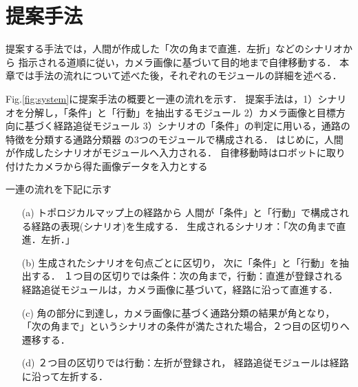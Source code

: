 \documentclass{sice-si}
\begin{document}
\section{提案手法}
提案する手法では，人間が作成した「次の角まで直進．左折」などのシナリオから
指示される道順に従い，カメラ画像に基づいて目的地まで自律移動する．
本章では手法の流れについて述べた後，それぞれのモジュールの詳細を述べる．
\par
Fig.\ref{fig:system}に提案手法の概要と一連の流れを示す．
提案手法は，1）シナリオを分解し，「条件」と「行動」を抽出するモジュール
2）カメラ画像と目標方向に基づく経路追従モジュール
3）シナリオの「条件」の判定に用いる，通路の特徴を分類する通路分類器
の3つのモジュールで構成される．
はじめに，人間が作成したシナリオがモジュールへ入力される．
自律移動時はロボットに取り付けたカメラから得た画像データを入力とする


一連の流れを下記に示す
\begin{enumerate}
    \item [(a)] トポロジカルマップ上の経路から
    人間が「条件」と「行動」で構成される経路の表現(シナリオ)を生成する．
    生成されるシナリオ：「次の角まで直進．左折．」
    \item [(b)] 生成されたシナリオを句点ごとに区切り，
    次に「条件」と「行動」を抽出する．
    １つ目の区切りでは条件：次の角まで，行動：直進が登録される
    経路追従モジュールは，カメラ画像に基づいて，経路に沿って直進する．
    \item [(c)] 角の部分に到達し，カメラ画像に基づく通路分類の結果が角となり，
    「次の角まで」というシナリオの条件が満たされた場合，２つ目の区切りへ遷移する．
    \item [(d)]２つ目の区切りでは行動：左折が登録され，
    経路追従モジュールは経路に沿って左折する．
\end{enumerate}
\end{document}
